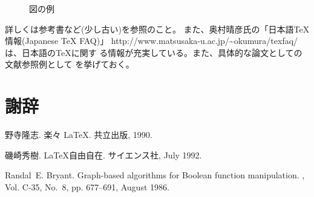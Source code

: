 \documentclass[a4paper,11pt]{jreport}
\begin{document}
\begin{figure}[htbp]
\begin{center}
\end{center}
\caption{図の例}
\label{figure:sample}
\end{figure}

詳しくは参考書など(少し古い)\cite{RakRak}\cite{JiyuuJizai}を参照のこと。
また、奥村晴彦氏の「日本語\TeX 情報(Japanese TeX FAQ)」
http://www.matsusaka-u.ac.jp/\~{}okumura/texfaq/ は、日本語の\TeX に関す
る情報が充実している。また、具体的な論文としての文献参照例として
\cite{bryant-ieeetc86}を挙げておく。


\chapter*{謝辞}

\newpage

\renewcommand{\bibname}{参考文献}

%
%

\begin{thebibliography}{1}
野寺隆志.
\newblock 楽々 \LaTeX.
\newblock 共立出版, 1990.

磯崎秀樹.
\newblock \LaTeX 自由自在.
\newblock サイエンス社, July 1992.

Randal~E. Bryant.
\newblock Graph-based algorithms for {B}oolean function manipulation.
, Vol. C-35, No.~8, pp. 677--691,
  August 1986.
\end{thebibliography}
\end{document}

